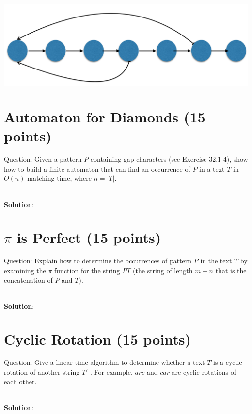\documentclass{article}
\begin{document}
\begin{center}
\includegraphics[scale=0.3]{hw7_2.png}
\end{center}


\section{Automaton for Diamonds (15 points)}
Question: Given a pattern $P$ containing gap characters (see Exercise 32.1-4), show how to build a finite automaton that can find an occurrence of $P$ in a text $T$ in $O(n)$ matching time, where $n = |T|$.

~\\
\textbf{Solution}:\newline
\indent 

\section{$\pi$ is Perfect (15 points)}
Question: Explain how to determine the occurrences of pattern $P$ in the text $T$ by examining the $\pi$ function for the string $PT$ (the string of length $m+n$ that is the concatenation of $P$ and $T$).

~\\
\textbf{Solution}:\newline
\indent

\section{Cyclic Rotation (15 points)}
Question: Give a linear-time algorithm to determine whether a text $T$ is a cyclic rotation of another string $T'$ . For example, $arc$ and $car$ are cyclic rotations of each other.

~\\
\textbf{Solution}:\newline
\indent
\end{document}
